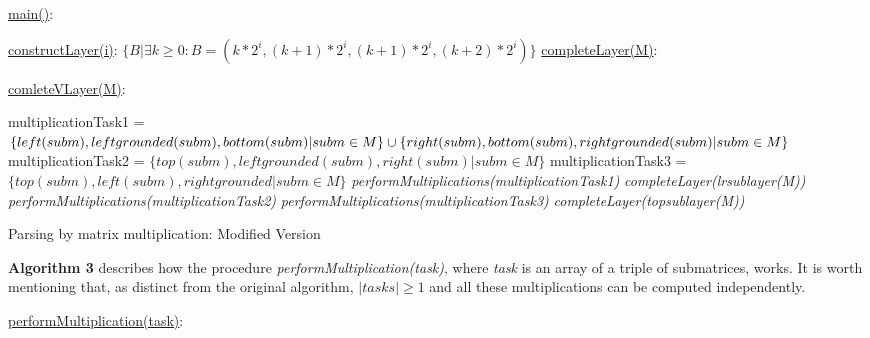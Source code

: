 \begin{algorithm}[t]
\SetAlgoNoLine
{}
\underline{main()}{:}{

 \BlankLine
 }

\underline{constructLayer(i)}{:}{
 \BlankLine
 $\{B | \exists k \geq 0 : B = (k*2^i, (k+1)*2^i, (k + 1)*2^i, (k+2)*2^i) \}$
 \BlankLine
    }
\underline{completeLayer(M)}{:}{
\BlankLine
{}
\BlankLine
}

\underline{comleteVLayer(M)}{:}{
 \BlankLine
 multiplicationTask1 = $\{left(subm), leftgrounded(subm), bottom(subm) | subm \in M \} \cup \linebreak  \{right(subm), bottom(subm), rightgrounded(subm) | subm \in M\}$\;
 \BlankLine
 multiplicationTask2 = $\{top(subm), leftgrounded(subm), right(subm) | subm \in M\}$\;
 \BlankLine
 multiplicationTask3 = $\{top(subm), left(subm), rightgrounded |subm \in M\}$\;
 \BlankLine
 \textit{performMultiplications(multiplicationTask1)}\;
 \textit{completeLayer(lrsublayer(M))}\;
 \textit{performMultiplications(multiplicationTask2)}\;
 \textit{performMultiplications(multiplicationTask3)}\;
 \textit{completeLayer(topsublayer(M))}

 }

\caption{Parsing by matrix multiplication: Modified Version}
\end{algorithm}

\textbf{Algorithm 3} describes how the procedure \textit{performMultiplication(task)}, where \textit{task} is an array of a triple of submatrices, works. It is worth mentioning that, as distinct from the original algorithm, $|tasks| \ge 1$ and all these multiplications can be computed independently.


\begin{algorithm}[h]
\SetAlgoNoLine
\underline{performMultiplication(task)}{:}{\\
}
\caption{}
\end{algorithm}

